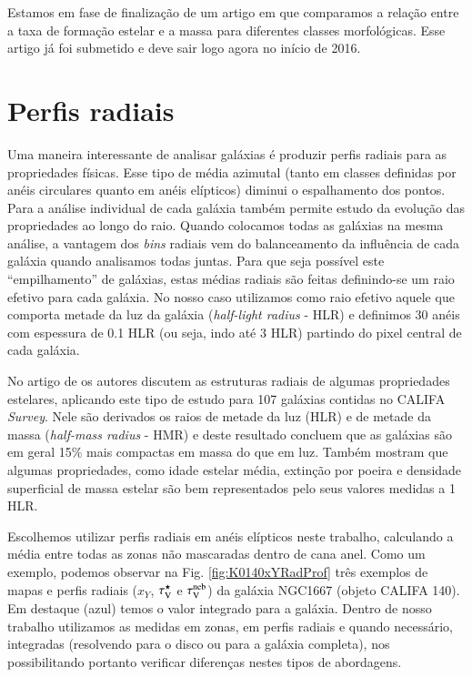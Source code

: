 Estamos em fase de finalização de um artigo em que comparamos a relação entre a taxa de formação
estelar e a massa para diferentes classes morfológicas. Esse artigo já foi submetido e deve sair
logo agora no início de 2016.

\section{Perfis radiais}
\label{sec:amostra:rad}

Uma maneira interessante de analisar galáxias é produzir perfis radiais para as propriedades
físicas. Esse tipo de média azimutal (tanto em classes definidas por anéis circulares quanto em
anéis elípticos) diminui o espalhamento dos pontos. Para a análise individual de cada galáxia também
permite estudo da evolução das propriedades ao longo do raio. Quando colocamos todas as galáxias na
mesma análise, a vantagem dos {\em bins} radiais vem do balanceamento da influência de cada galáxia
quando analisamos todas juntas. Para que seja possível este ``empilhamento'' de galáxias, estas
médias radiais são feitas definindo-se um raio efetivo para cada galáxia. No nosso caso utilizamos
como raio efetivo aquele que comporta metade da luz da galáxia ({\em half-light radius} - HLR) e
definimos 30 anéis com espessura de 0.1 HLR (ou seja, indo até 3 HLR) partindo do pixel central de
cada galáxia.

No artigo de \citet{GonzalezDelgado.etal.2014a} os autores discutem as estruturas radiais de algumas
propriedades estelares, aplicando este tipo de estudo para 107 galáxias contidas no CALIFA {\em
Survey}. Nele são derivados os raios de metade da luz (HLR) e de metade da massa ({\em half-mass
radius} - HMR) e deste resultado concluem que as galáxias são em geral 15\% mais compactas em massa
do que em luz. Também mostram que algumas propriedades, como idade estelar média, extinção por
poeira e densidade superficial de massa estelar são bem representados pelo seus valores medidas a 1
HLR.

Escolhemos utilizar perfis radiais em anéis elípticos neste trabalho, calculando a média entre todas
as zonas não mascaradas dentro de cana anel. Como um exemplo, podemos observar na Fig.
\ref{fig:K0140xYRadProf} três exemplos de mapas e perfis radiais ($x_Y$, $\tau_{\mathrm{V}}^\star$ e $\tau_{\mathrm{V}}^{\mathrm{neb}}$) da
galáxia NGC1667 (objeto CALIFA 140). Em destaque (azul) temos o valor integrado para a galáxia.
Dentro de nosso trabalho utilizamos as medidas em zonas, em perfis radiais e quando necessário,
integradas (resolvendo para o disco ou para a galáxia completa), nos possibilitando portanto
verificar diferenças nestes tipos de abordagens.

